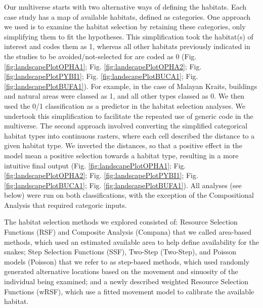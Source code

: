 \documentclass[10pt,a4paper]{article}
\begin{document}
Our multiverse starts with two alternative ways of defining the habitats.
Each case study has a map of available habitats, defined as categories.
One approach we used is to examine the habitat selection by retaining these categories, only simplifying them to fit the hypotheses.
This simplification took the habitat(s) of interest and codes them as 1, whereas all other habitats previously indicated in the studies to be avoided/not-selected for are coded as 0 (Fig. \ref{fig:landscapePlotOPHA1}; Fig. \ref{fig:landscapePlotOPHA2}; Fig. \ref{fig:landscapePlotPYBI1}; Fig. \ref{fig:landscapePlotBUCA1}; Fig. \ref{fig:landscapePlotBUFA1}).
For example, in the case of Malayan Kraits, buildings and natural areas were classed as 1, and all other types classed as 0.
We then used the 0/1 classification as a predictor in the habitat selection analyses.
We undertook this simplification to facilitate the repeated use of generic code in the multiverse.
The second approach involved converting the simplified categorical habitat types into continuous rasters, where each cell described the distance to a given habitat type.
We inverted the distances, so that a positive effect in the model mean a positive selection towards a habitat type, resulting in a more intuitive final output (Fig. \ref{fig:landscapePlotOPHA1}; Fig. \ref{fig:landscapePlotOPHA2}; Fig. \ref{fig:landscapePlotPYBI1}; Fig. \ref{fig:landscapePlotBUCA1}; Fig. \ref{fig:landscapePlotBUFA1}).
All analyses (see below) were run on both classifications, with the exception of the Compositional Analysis that required categoric inputs.

The habitat selection methods we explored consisted of: Resource Selection Functions (RSF) and Composite Analysis (Compana) that we called area-based methods, which used an estimated available area to help define availability for the snakes; Step Selection Functions (SSF), Two-Step (Two-Step), and Poisson models (Poisson) that we refer to as step-based methods, which used randomly generated alternative locations based on the movement and sinuosity of the individual being examined; and a newly described weighted Resource Selection Functions (wRSF), which use a fitted movement model to calibrate the available habitat.
\end{document}
